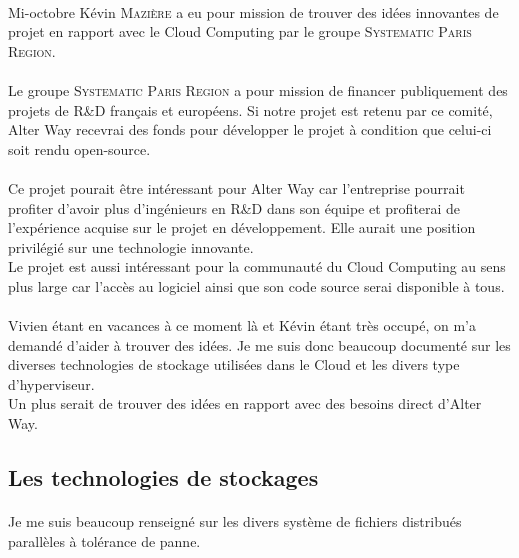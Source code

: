 \paragraph*{}
Mi-octobre Kévin \textsc{Mazière} a eu pour mission de trouver des idées innovantes de projet en rapport avec le Cloud Computing par le groupe \textsc{Systematic Paris Region}.

\paragraph*{}
Le groupe \textsc{Systematic Paris Region} a pour mission de financer publiquement des projets de R\&D français et européens. Si notre projet est retenu par ce comité, Alter Way
recevrai des fonds pour développer le projet à condition que celui-ci soit rendu open-source.

\paragraph*{}
Ce projet pourait être intéressant pour Alter Way car l'entreprise pourrait profiter d'avoir plus d'ingénieurs en R\&D dans son équipe et profiterai de l'expérience acquise sur le
projet en développement. Elle aurait une position privilégié sur une technologie innovante.\\
Le projet est aussi intéressant pour la communauté du Cloud Computing au sens plus large car l'accès au logiciel ainsi que son code source serai disponible à tous.


\paragraph*{}
Vivien étant en vacances à ce moment là et Kévin étant très occupé, on m'a demandé d'aider à trouver des idées.
Je me suis donc beaucoup documenté sur les diverses technologies de stockage utilisées dans le Cloud et les divers type d'hyperviseur.
\\
Un plus serait de trouver des idées en rapport avec des besoins direct d'Alter Way.


\subsection{Les technologies de stockages}
\label{fsdpft}
\paragraph*{}
Je me suis beaucoup renseigné sur les divers système de fichiers distribués parallèles à tolérance de panne.

